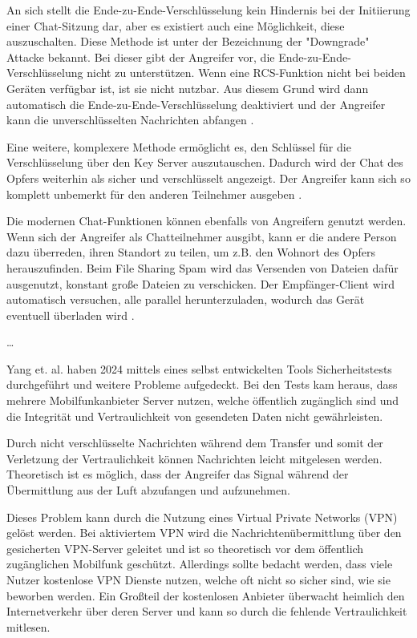 \documentclass[conference]{IEEEtran}
\begin{document}
An sich stellt die Ende-zu-Ende-Verschlüsselung kein Hindernis bei der Initiierung einer Chat-Sitzung dar, aber es existiert auch eine Möglichkeit, diese auszuschalten.
Diese Methode ist unter der Bezeichnung der "Downgrade" Attacke bekannt.
Bei dieser gibt der Angreifer vor, die Ende-zu-Ende-Verschlüsselung nicht zu unterstützen.
Wenn eine RCS-Funktion nicht bei beiden Geräten verfügbar ist, ist sie nicht nutzbar.
Aus diesem Grund wird dann automatisch die Ende-zu-Ende-Verschlüsselung deaktiviert und der Angreifer kann die unverschlüsselten Nachrichten abfangen \cite{5gmsg}.

Eine weitere, komplexere Methode ermöglicht es, den Schlüssel für die Verschlüsselung über den Key Server auszutauschen.
Dadurch wird der Chat des Opfers weiterhin als sicher und verschlüsselt angezeigt.
Der Angreifer kann sich so komplett unbemerkt für den anderen Teilnehmer ausgeben \cite{5gmsg}.

Die modernen Chat-Funktionen können ebenfalls von Angreifern genutzt werden.
Wenn sich der Angreifer als Chatteilnehmer ausgibt, kann er die andere Person dazu überreden, ihren Standort zu teilen, um z.B. den Wohnort des Opfers herauszufinden.
Beim File Sharing Spam wird das Versenden von Dateien dafür ausgenutzt, konstant große Dateien zu verschicken.
Der Empfänger-Client wird automatisch versuchen, alle parallel herunterzuladen, wodurch das Gerät eventuell überladen wird \cite{5gmsg}.

\dots

Yang et. al. \cite{uncoversec} haben 2024 mittels eines selbst entwickelten Tools Sicherheitstests durchgeführt und weitere Probleme aufgedeckt.
Bei den Tests kam heraus, dass mehrere Mobilfunkanbieter Server nutzen, welche öffentlich zugänglich sind und die Integrität und Vertraulichkeit von gesendeten Daten nicht gewährleisten.

Durch nicht verschlüsselte Nachrichten während dem Transfer und somit der Verletzung der Vertraulichkeit können Nachrichten leicht mitgelesen werden.
Theoretisch ist es möglich, dass der Angreifer das Signal während der Übermittlung aus der Luft abzufangen und aufzunehmen.

Dieses Problem kann durch die Nutzung eines Virtual Private Networks (VPN) gelöst werden.
Bei aktiviertem VPN wird die Nachrichtenübermittlung über den gesicherten VPN-Server geleitet und ist so theoretisch vor dem öffentlich zugänglichen Mobilfunk geschützt.
Allerdings sollte bedacht werden, dass viele Nutzer kostenlose VPN Dienste nutzen, welche oft nicht so sicher sind, wie sie beworben werden.
Ein Großteil der kostenlosen Anbieter überwacht heimlich den Internetverkehr über deren Server und kann so durch die fehlende Vertraulichkeit mitlesen.
\end{document}
